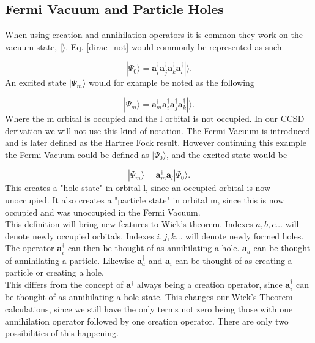 \subsection{Fermi Vacuum and Particle Holes}

When using creation and annihilation operators it is common they work on the vacuum state, $| \rangle$. Eq. \eqref{dirac_not} would commonly be represented as such

\begin{equation}
|\Psi_0 \rangle = \textbf{a}^{\dag}_i
\textbf{a}^{\dag}_j
\textbf{a}^{\dag}_k
\textbf{a}^{\dag}_l |\rangle .
\end{equation}
An excited state $|\Psi_m\rangle$ would for example be noted as the following

\begin{equation}
|\Psi_m \rangle = \textbf{a}^{\dag}_m
\textbf{a}^{\dag}_i
\textbf{a}^{\dag}_j
\textbf{a}^{\dag}_k |\rangle .
\end{equation}
Where the m orbital is occupied and the l orbital is not occupied. In our CCSD derivation we will not use this kind of notation. The Fermi Vacuum is introduced and is later defined as the Hartree Fock result. However continuing this example the Fermi Vacuum could be defined as $|\Psi_0\rangle$, and the excited state would be

\begin{equation}
|\Psi_m\rangle = \textbf{a}^{\dag}_m \textbf{a}_l |\Psi_0\rangle .
\end{equation}
This creates a "hole state" in orbital l, since an occupied orbital is now unoccupied. It also creates a "particle state" in orbital m, since this is now occupied and was unoccupied in the Fermi Vacuum. \\

This definition will bring new features to Wick's theorem. Indexes $a, b, c \dots$ will denote newly occupied orbitals. Indexes $i, j, k \dots$ will denote newly formed holes. The operator $\textbf{a}^{\dag}_i$ can then be thought of as annihilating a hole. $\textbf{a}_a$ can be thought of annihilating a particle. Likewise $\textbf{a}^{\dag}_a$ and $\textbf{a}_i$ can be thought of as creating a particle or creating a hole. \\

This differs from the concept of $\textbf{a}^{\dag}$ always being a creation operator, since $\textbf{a}^{\dag}_i$ can be thought of as annihilating a hole state. This changes our Wick's Theorem calculations, since we still have the only terms not zero being those with one annihilation operator followed by one creation operator. There are only two possibilities of this happening.

